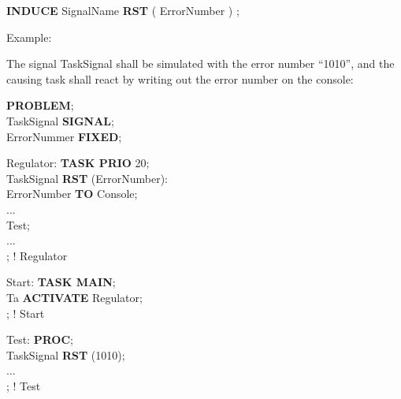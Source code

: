 {\bf INDUCE} SignalName {\bf RST} ( ErrorNumber ) ;

Example:

The signal TaskSignal shall be simulated with the error number
``1010'', and the causing task shall react by writing out the error
number on the console:

{\bf PROBLEM};\\
 TaskSignal {\bf SIGNAL};\\
 ErrorNummer {\bf FIXED};

Regulator: {\bf TASK PRIO} 20;\\
 TaskSignal {\bf RST} (ErrorNumber):\\
\x {} ErrorNumber {\bf TO} Console;\\
\x \x ...\\
\x Test;\\
\x \x ...\\
; ! Regulator

Start: {\bf TASK MAIN};\\
 Ta {\bf ACTIVATE} Regulator;\\   %
; ! Start

Test: {\bf PROC};\\
 TaskSignal {\bf RST} (1010);\\
\x ...\\
; ! Test



